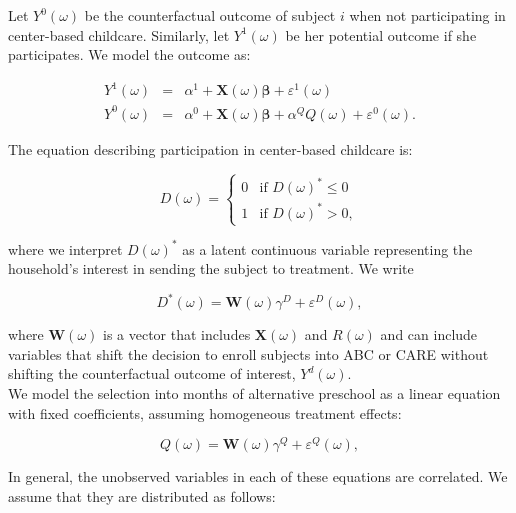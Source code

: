 \begin{appendices}
\noindent Let $Y^{0}(\omega)$ be the counterfactual outcome of subject $i$ when not participating in center-based childcare. Similarly, let $Y^{1}(\omega)$ be her potential outcome if she participates. We model the outcome as: 
 
\begin{eqnarray}
Y^1(\omega) &=& \alpha^1+\mathbf{X}(\omega) \mathbf{\beta}                 +\varepsilon^1(\omega) \nonumber  \\
Y^0(\omega) &=& \alpha^0+\mathbf{X}(\omega) \mathbf{\beta} + \alpha^Q Q(\omega)+\varepsilon^0(\omega).  \label{eq:potout}
\end{eqnarray}

\noindent The equation describing participation in center-based childcare is: 

\begin{equation}
D(\omega) = \left\{
        \begin{array}{ll}
        	0 &\text{if } D(\omega)^* \leq  0 \\
            1 &\text{if } D(\omega)^* > 0, \label{eq:sel1}
        \end{array}
    \right. 
\end{equation}

\noindent where we interpret $D(\omega)^*$ as a latent continuous variable representing the household's interest in sending the subject to treatment. We write

\begin{equation}
D^{*}(\omega) = \mathbf{W}(\omega) \gamma^{D} + \varepsilon^{D}(\omega), \label{eq:probitD}
\end{equation}

\noindent where $\mathbf{W}(\omega)$ is a vector that includes $\mathbf{X}(\omega)$ and $R(\omega)$ and can include variables that shift the decision to enroll subjects into ABC or CARE without shifting the counterfactual outcome of interest, $Y^{d}(\omega)$. \\

\noindent We model the selection into months of alternative preschool as a linear equation with fixed coefficients, assuming homogeneous treatment effects:

\begin{equation}
Q(\omega) = \mathbf{W}(\omega) \gamma^{Q} + \varepsilon^{Q}(\omega), \label{eq:selq}
\end{equation}

\noindent In general, the unobserved variables in each of these equations are correlated. We assume that they are distributed as follows: 


\end{appendices}
